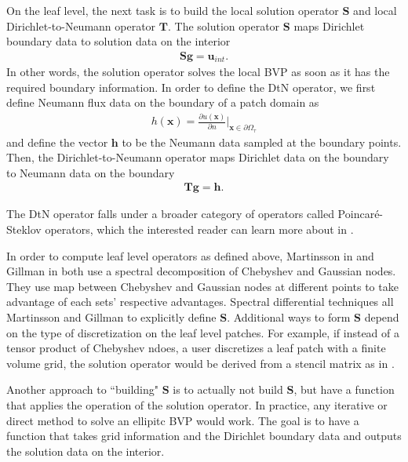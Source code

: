 On the leaf level, the next task is to build the local solution operator $\textbf{S}$ and local Dirichlet-to-Neumann operator $\textbf{T}$. The solution operator $\textbf{S}$ maps Dirichlet boundary data to solution data on the interior
\begin{align}
    \textbf{S} \textbf{g} = \textbf{u}_{int}.
\end{align}
In other words, the solution operator solves the local BVP as soon as it has the required boundary information. In order to define the DtN operator, we first define Neumann flux data on the boundary of a patch domain as
\begin{align}
h(\textbf{x}) = \frac{\partial u(\textbf{x})}{\partial n} \Big|_{\textbf{x} \in \partial \Omega_{\tau}}
\end{align}
and define the vector $\textbf{h}$ to be the Neumann data sampled at the boundary points. Then, the Dirichlet-to-Neumann operator maps Dirichlet data on the boundary to Neumann data on the boundary
\begin{align}
    \textbf{T} \textbf{g} = \textbf{h}.
\end{align}

The DtN operator falls under a broader category of operators called Poincaré-Steklov operators, which the interested reader can learn more about in \cite{quarteroni1991theory}.

In order to compute leaf level operators as defined above, Martinsson in \cite{martinsson2015hierarchical} and Gillman in \cite{gillman2014direct} both use a spectral decomposition of Chebyshev and Gaussian nodes. They use map between Chebyshev and Gaussian nodes at different points to take advantage of each sets' respective advantages. Spectral differential techniques all Martinsson and Gillman to explicitly define $\textbf{S}$. Additional ways to form $\textbf{S}$ depend on the type of discretization on the leaf level patches. For example, if instead of a tensor product of Chebyshev ndoes, a user discretizes a leaf patch with a finite volume grid, the solution operator would be derived from a stencil matrix as in \cite{leveque2007finite}.

Another approach to ``building" $\textbf{S}$ is to actually not build $\textbf{S}$, but have a function that applies the operation of the solution operator. In practice, any iterative or direct method to solve an ellipitc BVP would work. The goal is to have a function that takes grid information and the Dirichlet boundary data and outputs the solution data on the interior.

